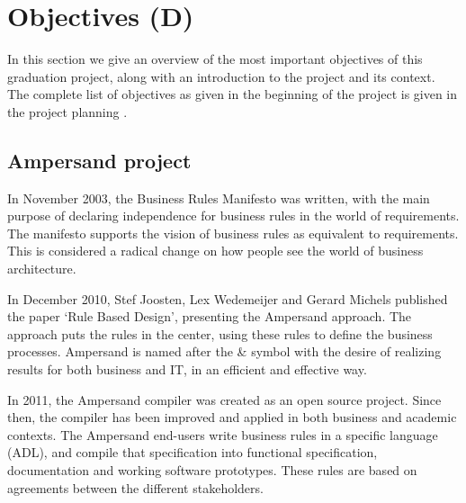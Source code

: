 
\section{Objectives (D)}
\label{sec:objectives}
In this section we give an overview of the most important objectives of this graduation project, along with an introduction to the project and its context.
The complete list of objectives as given in the beginning of the project is given in the project planning .

\subsection{Ampersand project}
In November 2003, the Business Rules Manifesto  was written, with the main purpose of declaring independence for business rules in the world of requirements.
The manifesto supports the vision of business rules as equivalent to requirements.
This is considered a radical change on how people see the world of business architecture.

In December 2010, Stef Joosten, Lex Wedemeijer and Gerard Michels published the paper `Rule Based Design', presenting the Ampersand approach.
The approach puts the rules in the center, using these rules to define the business processes.
Ampersand is named after the \& symbol with the desire of realizing results for both business and IT, in an efficient and effective way.

In 2011, the Ampersand compiler was created as an open source project.
Since then, the compiler has been improved and applied in both business and academic contexts.
The Ampersand end-users write business rules in a specific language (ADL), and compile that specification into functional specification, documentation and working software prototypes.
%
These rules are based on agreements between the different stakeholders.

